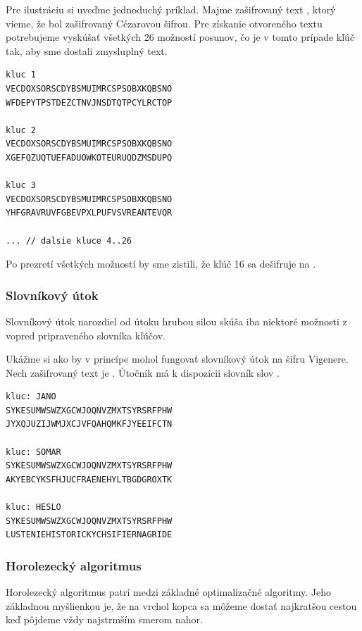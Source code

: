 Pre ilustráciu si uveďme jednoduchý príklad. Majme zašifrovaný text , ktorý vieme,
že bol zašifrovaný Cézarovou šifrou.
Pre získanie otvoreného textu potrebujeme vyskúšať všetkých 26 možností posunov, čo je v tomto prípade kľúč tak, aby sme dostali zmysluplný text.

\begin{lstlisting}
kluc 1
VECDOXSORSCDYBSMUIMRCSPSOBXKQBSNO
WFDEPYTPSTDEZCTNVJNSDTQTPCYLRCTOP

kluc 2
VECDOXSORSCDYBSMUIMRCSPSOBXKQBSNO
XGEFQZUQTUEFADUOWKOTEURUQDZMSDUPQ

kluc 3
VECDOXSORSCDYBSMUIMRCSPSOBXKQBSNO
YHFGRAVRUVFGBEVPXLPUFVSVREANTEVQR

... // dalsie kluce 4..26
\end{lstlisting}

Po prezretí všetkých možností by sme zistili, že kľúč 16 sa dešifruje na .


\subsubsection{Slovníkový útok}
Slovníkový útok narozdiel od útoku hrubou silou skúša iba niektoré možnosti z vopred pripraveného slovníka kľúčov.

Ukážme si ako by v princípe mohol fungovať slovníkový útok na šifru Vigenere.
Nech zašifrovaný text je . Útočník má k dispozícii slovník slov .

\begin{lstlisting}
kluc: JANO
SYKESUMWSWZXGCWJOQNVZMXTSYRSRFPHW
JYXQJUZIJWMJXCJVFQAHQMKFJYEEIFCTN

kluc: SOMAR
SYKESUMWSWZXGCWJOQNVZMXTSYRSRFPHW
AKYEBCYKSFHJUCFRAENEHYLTBGDGROXTK

kluc: HESLO
SYKESUMWSWZXGCWJOQNVZMXTSYRSRFPHW
LUSTENIEHISTORICKYCHSIFIERNAGRIDE
\end{lstlisting}

\subsubsection{Horolezecký algoritmus}
Horolezecký algoritmus patrí medzi základné optimalizačné algoritmy.
Jeho základnou myšlienkou je, že na vrchol kopca sa môžeme dostať najkratšou cestou keď pôjdeme vždy najstrmším smerom nahor.

